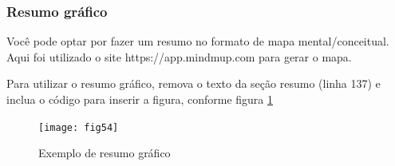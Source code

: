 \documentclass[	DIV=calc,%
paper=a4,%
fontsize=12pt,%
onecolumn]{scrartcl}	 					%
\begin{document}
	\subsubsection{Resumo gráfico}
	
	Você pode optar por fazer um resumo no formato de mapa mental/conceitual. 
	Aqui foi utilizado o site https://app.mindmup.com para gerar o mapa.
	
	Para utilizar o resumo gráfico, remova o texto da seção resumo (linha 137) e inclua o código para inserir a figura, conforme figura \ref{fig54}
	
	\begin{figure}[h]
		\centering
		\texttt{[image: fig54]}
		\caption{Exemplo de resumo gráfico}
		\label{fig54}	
	\end{figure}
	
	
\end{document}
